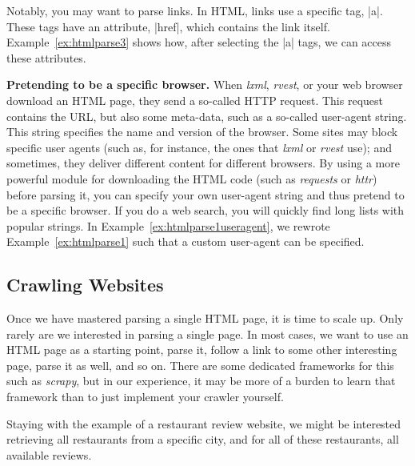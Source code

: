 Notably, you may want to parse links. In HTML, links use a specific tag, |a|. These tags have an attribute, |href|, which contains the link itself. Example~\ref{ex:htmlparse3} shows how, after selecting the |a| tags, we can access these attributes.




\begin{feature}\textbf{Pretending to be a specific browser.}  When \emph{lxml}, \emph{rvest}, or your web browser download an HTML page, they send a so-called HTTP request. This request contains the URL, but also some meta-data, such as a so-called user-agent string. This string specifies the name and version of the browser. Some sites may block specific user agents (such as, for instance, the ones that \emph{lxml} or \emph{rvest} use); and sometimes, they deliver different content for different browsers. By using a more powerful module for downloading the HTML code (such as \emph{requests} or \emph{httr}) before parsing it, you can specify your own user-agent string and thus pretend to be a specific browser. If you do a web search, you will quickly find long lists with popular strings. In Example~\ref{ex:htmlparse1useragent}, we rewrote Example~\ref{ex:htmlparse1} such that a custom user-agent can be specified.
\end{feature}





\subsection{Crawling Websites}
\label{sec:crawling}

Once we have mastered parsing a single HTML page, it is time to scale
up. Only rarely are we interested in parsing a single page. In most
cases, we want to use an HTML page as a starting point, parse it,
follow a link to some other interesting page, parse it as well, and so
on. There are some dedicated frameworks for this such as \emph{scrapy},
but in our experience, it may be more of a burden to learn that
framework than to just implement your crawler yourself.

Staying with the example of a restaurant review website, we might be
interested retrieving all restaurants from a specific city, and for
all of these restaurants, all available reviews.

